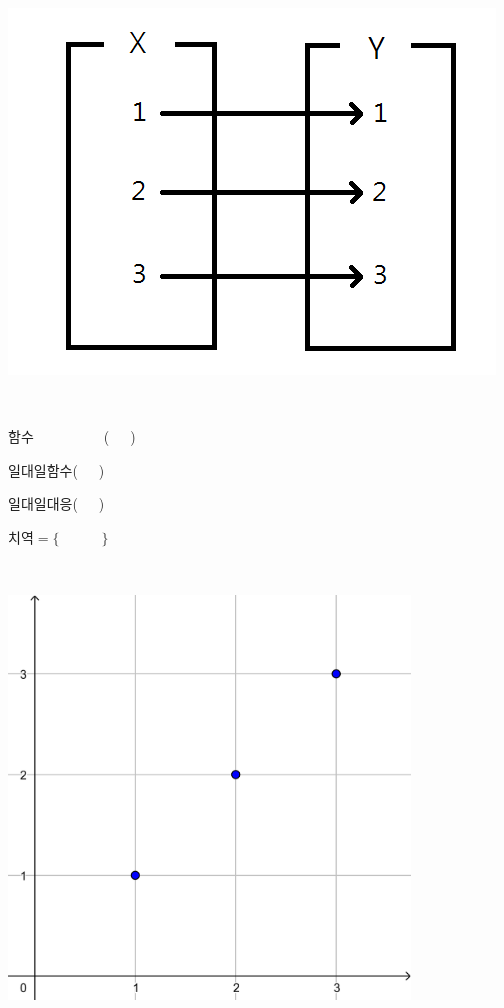 \documentclass[a4paper]{oblivoir}
\begin{document}
%
\begin{minipage}{0.4\textwidth}
\includegraphics[width=\textwidth]{identity}
\end{minipage}
~
\begin{minipage}{0.20\textwidth}
함수~~~~~~~~~~(~~~)\par\bigskip
일대일함수(~~~)\par\bigskip
일대일대응(~~~)\par\bigskip
치역\(=\{\qquad\quad\}\)
\end{minipage}
~
\begin{minipage}{0.35\textwidth}
\includegraphics[width=0.8\textwidth]{identity-}
\end{minipage}
\end{document}

